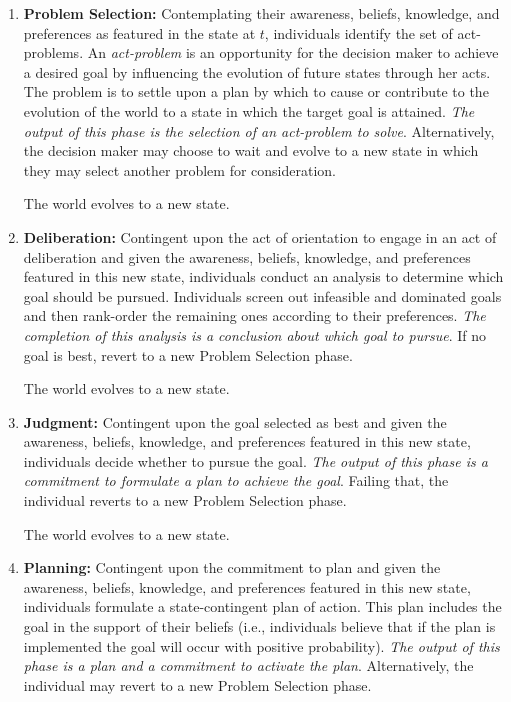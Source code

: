 \documentclass[
11pt,
titlepage,
reqno,
]{article}%
\theoremstyle{definition}
\begin{document}
	\begin{enumerate}
		\item \textbf{Problem Selection:} 
		Contemplating their awareness, beliefs, knowledge, and preferences as featured in the state at $t$, individuals identify the set of act-problems.
		An \textit{act-problem} is an opportunity for the decision maker to achieve a desired goal by influencing the evolution of future states through her acts. 
		The problem is to settle upon a plan by which to cause or contribute to the evolution of the world to a state in which the target goal is attained.
		\textit{	The output of this phase is the selection of an act-problem to solve}.
		Alternatively, the decision maker may choose to wait and evolve to a new state in which they may select another problem for consideration.
		
		The world evolves to a new state.
		\item \textbf{Deliberation:} 
		Contingent upon the act of orientation to engage in an act of deliberation and given the awareness, beliefs, knowledge, and preferences featured in this new state, individuals conduct an analysis to determine which goal should be pursued. 
		Individuals screen out infeasible and dominated goals and then rank-order the remaining ones according to their preferences. 
		\textit{The completion of this analysis is a conclusion about which goal to pursue}. 
		If no goal is best, revert to a new Problem Selection phase.
		
		The world evolves to a new state.
		
		\item \textbf{Judgment:} 
		Contingent upon the goal selected as best and given the awareness, beliefs, knowledge, and preferences featured in this new state, individuals decide whether to pursue the goal. 
		\textit{The output of this phase is a commitment to formulate a plan to achieve the goal}. 
		Failing  that, the individual reverts to a new Problem Selection phase.
		
		The world evolves to a new state.
		
		\item \textbf{Planning:} 
		Contingent upon the commitment to plan and given the awareness, beliefs, knowledge, and preferences featured in this new state, individuals  formulate a state-contingent plan of action. 
		This plan includes the goal in the support of their beliefs (i.e., individuals believe that if the plan is implemented the goal will occur with positive probability). 
		\textit{The output of this phase is a plan and a commitment to activate the plan}.
		Alternatively, the individual may revert to a  new Problem Selection phase.
		

\end{enumerate}
\end{document}

